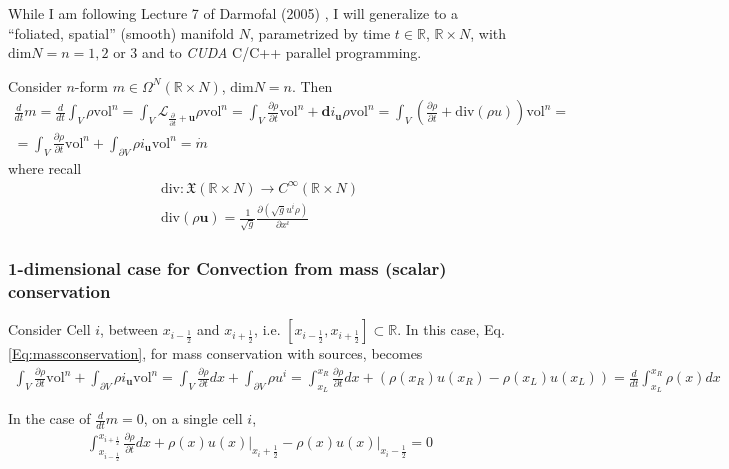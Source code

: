 \documentclass[10pt]{amsart}
\begin{document}
\begin{multicols*}{2}
While I am following Lecture 7 of Darmofal (2005) \cite{Darm2005}, I will generalize to a ``foliated, spatial'' (smooth) manifold $N$, parametrized by time $t\in \mathbb{R}$, $\mathbb{R}\times N$, with $\text{dim}N = n = 1,2 \text{ or } 3$ and to \emph{CUDA} C/C++ parallel programming.

Consider $n$-form $m \in \Omega^N(\mathbb{R}\times N)$, $\text{dim}N = n$.  Then
\begin{equation}\label{Eq:massconservation}
  \begin{gathered}
    \frac{d}{dt} m = \frac{d}{dt} \int_V \rho \text{vol}^n = \int_V \mathcal{L}_{\frac{ \partial }{ \partial t} + \mathbf{u} } \rho \text{vol}^n = \int_V \frac{ \partial \rho }{ \partial t} \text{vol}^n + \mathbf{d}i_{\mathbf{u}} \rho \text{vol}^n = \int_V \left( \frac{ \partial \rho }{ \partial t} + \text{div}( \rho u ) \right) \text{vol}^n = \\
    = \int_V \frac{ \partial \rho }{ \partial t} \text{vol}^n + \int_{\partial V} \rho i_{\mathbf{u}} \text{vol}^n = \dot{m}
\end{gathered}
  \end{equation}
where recall
\[
\begin{aligned}
  \text{div} : \mathfrak{X}(\mathbb{R}\times N) \to C^{\infty}(\mathbb{R} \times N ) \\ 
 \text{div}(\rho \mathbf{u} ) = \frac{1}{\sqrt{g}} \frac{ \partial ( \sqrt{g} u^i \rho ) }{ \partial x^i } 
  \end{aligned}
\]

\subsubsection{1-dimensional case for Convection from mass (scalar) conservation}

Consider Cell $i$, between $x_{i-\frac{1}{2} }$ and $ x_{i+\frac{1}{2} }$, i.e. $[x_{i-\frac{1}{2} }, x_{i+\frac{1}{2} }]\subset \mathbb{R}$.  In this case, Eq. \ref{Eq:massconservation}, for mass conservation with sources, becomes
\[
\begin{gathered}
  \int_V \frac{ \partial \rho}{ \partial t} \text{vol}^n + \int_{\partial V} \rho i_{\mathbf{u}} \text{vol}^n = \int_V \frac{ \partial \rho }{ \partial t} dx + \int_{\partial V} \rho u^i = \int_{x_L}^{x_R} \frac{ \partial \rho }{ \partial t} dx + (\rho(x_R)u(x_R) - \rho(x_L)u(x_L) ) = \frac{d}{dt} \int_{x_L}^{x_R} \rho(x) dx
  \end{gathered}
\]

In the case of $\frac{d}{dt}m = 0$, on a single cell $i$,
\[
\begin{gathered}
  \int_{x_{i-\frac{1}{2} }}^{x_{i+\frac{1}{2} } } \frac{ \partial \rho }{ \partial t} dx + \left. \rho(x) u(x) \right|_{x_i + \frac{1}{2} } - \left. \rho(x)u(x) \right|_{x_i-\frac{1}{2} } = 0 
  \end{gathered}
\]


\end{multicols*}
\end{document}
